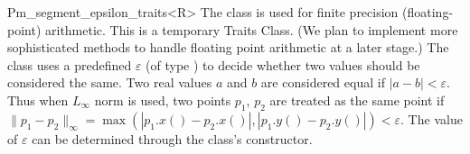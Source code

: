 
\ccRefPageBegin


\begin {ccRefClass} {Pm_segment_epsilon_traits<R>}
    The class
     is used for finite
    precision (floating-point) arithmetic. 
    This is a temporary Traits
    Class.  (We plan to implement more sophisticated methods to handle
    floating point arithmetic at a later stage.) 
    The class uses a
    predefined $\varepsilon$ (of type ) to decide
    whether two values should be considered the same.  Two real values
    $a$ and $b$ are considered equal if $|a - b| < \varepsilon$. Thus
    when $L_{\infty}$ norm is used, two points $p_1$, $p_2$ are
    treated as the same point if $\| p_1 - p_2\|_{\infty} =
    \max(|p_1.x() - p_2.x()|, |p_1.y() - p_2.y()|) < \varepsilon $.
    The value of $\varepsilon$ can be determined through the class's
    constructor. 


\ccIsModel
 
    


    
    

     
 
\end{ccRefClass} %

\ccRefPageEnd
